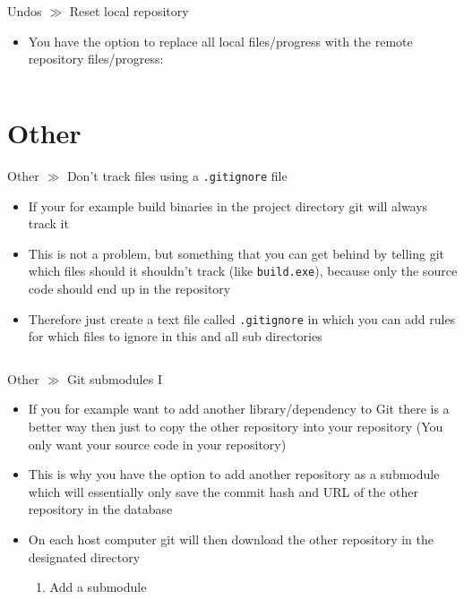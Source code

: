 \documentclass[10pt]{beamer}
\begin{document}
\begin{frame}{Undos $\gg$ Reset local repository}
    \begin{itemize}
        \item You have the option to replace all local files/progress with the remote repository files/progress:
        \inputminted[bgcolor=lightGreyCustom,fontsize=\scriptsize]{sh}{./resources/git_reset_to_remote.sh}
    \end{itemize}
\end{frame}


\section{Other}

\begin{frame}{Other $\gg$ Don't track files using a \texttt{.gitignore} file}
	\begin{itemize}
		\item If your for example build binaries in the project directory git will always track it
		\item This is not a problem, but something that you can get behind by telling git which files should it shouldn't track (like \texttt{build.exe}), because only the source code should end up in the repository
		\item Therefore just create a text file called \texttt{.gitignore} in which you can add rules for which files to ignore in this and all sub directories
		\inputminted[bgcolor=lightGreyCustom,fontsize=\scriptsize]{sh}{./resources/.gitignore}
	\end{itemize}
\end{frame}

\begin{frame}{Other $\gg$ Git submodules I}
	\begin{itemize}
		\item If you for example want to add another library/dependency to Git there is a better way then just to copy the other repository into your repository (You only want your source code in your repository)
		\item This is why you have the option to add another repository as a submodule which will essentially only save the commit hash and URL of the other repository in the database
		\item On each host computer git will then download the other repository in the designated directory
		\begin{enumerate}
			\item Add a submodule
			\inputminted[bgcolor=lightGreyCustom,fontsize=\scriptsize]{sh}{./resources/git_submodule_01_add.sh}
		\end{enumerate}
	\end{itemize}
\end{frame}
\end{document}
